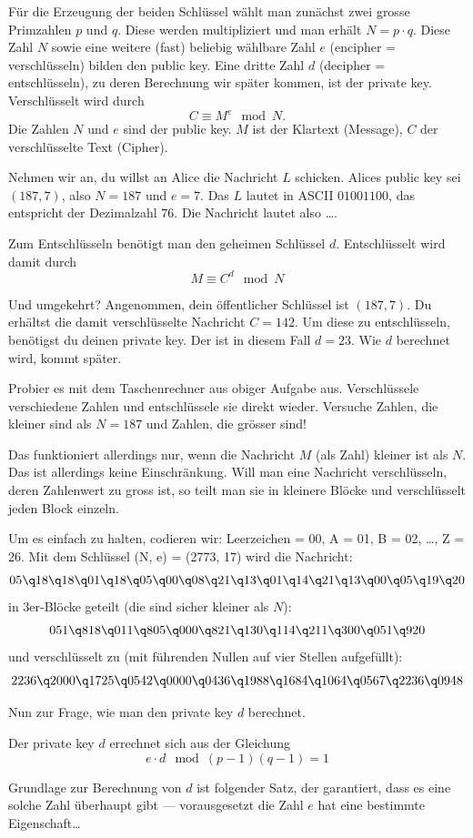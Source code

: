 \documentclass[%
11pt,%
twoside,%
titlepage,%
german,%
headsepline%
]{scrartcl}
\begin{document}
Für die Erzeugung der beiden Schlüssel wählt man zunächst zwei grosse Primzahlen $p$ und $q$. Diese werden multipliziert und man erhält $N=p\cdot q$. Diese Zahl  $N$ sowie eine weitere (fast) beliebig wählbare Zahl  $e$ (encipher = verschlüsseln) bilden den public key. Eine dritte Zahl $d$ (decipher = entschlüsseln), zu deren Berechnung wir später kommen, ist der private key.
Verschlüsselt wird durch
$$C\equiv M^e\mod N.$$
Die Zahlen $N$ und $e$ sind der public key. $M$ ist der Klartext (Message), $C$ der verschlüsselte Text (Cipher).
\begin{ueb}
Nehmen wir an, du willst an Alice die Nachricht $L$ schicken. Alices public key sei $(187, 7)$, also $N=187$ und $e=7$.
Das $L$ lautet in ASCII $01001100$, das entspricht der Dezimalzahl $76$. Die Nachricht lautet also \dots.
\end{ueb}
\noindent Zum Entschlüsseln benötigt man den geheimen Schlüssel $d$. Entschlüsselt wird damit durch $$M\equiv C^d\mod N$$
\begin{ueb}
Und umgekehrt? Angenommen, dein \"offentlicher Schlüssel ist $(187, 7)$. Du erhältst die damit verschlüsselte Nachricht $C=142$. Um diese zu entschlüsseln, ben\"otigst du deinen private key. Der ist in diesem Fall $d=23$. Wie $d$ berechnet wird, kommt später.
\end{ueb}

\begin{ueb}
Probier es mit dem Taschenrechner aus obiger Aufgabe aus. Verschlüssele verschiedene Zahlen und entschlüssele sie direkt wieder. Versuche Zahlen, die kleiner sind als $N=187$ und Zahlen, die gr\"osser sind!
\end{ueb}

\begin{bem}
Das funktioniert allerdings nur, wenn die Nachricht  $M$ (als Zahl) kleiner ist als $N$. Das ist allerdings keine Einschränkung. Will man eine Nachricht verschlüsseln, deren Zahlenwert zu gross ist, so teilt man sie in kleinere Blöcke und verschlüsselt jeden Block einzeln.
\end{bem}

\begin{bsp}
Um es einfach zu halten, codieren wir: Leerzeichen = 00, A = 01, B = 02, \dots, Z = 26.
Mit dem Schlüssel (N, e) = (2773, 17) wird die Nachricht:
$$05\q 18\q 18\q 01\q 18\q 05\q 00\q 08\q 21\q 13\q 01\q 14\q 21\q 13\q 00\q 05\q 19\q 20$$
in 3er-Blöcke geteilt (die sind sicher kleiner als $N$):
$$051\q 818\q 011\q 805\q 000\q 821\q 130\q 114\q 211\q 300\q 051\q 920$$	
und verschlüsselt zu (mit führenden Nullen auf vier Stellen aufgefüllt):
$$2236\q 2000\q 1725\q 0542\q 0000\q 0436\q 1988\q 1684\q 1064\q 0567\q 2236\q 0948$$
\end{bsp}
Nun zur Frage, wie man den private key $d$ berechnet.
\begin{bem}
Der private key $d$ errechnet sich aus der Gleichung
$$e\cdot d\mod(p-1)(q-1)=1$$
\end{bem}
\noindent Grundlage zur Berechnung von $d$ ist folgender Satz, der garantiert, dass es eine solche Zahl überhaupt gibt --- vorausgesetzt die Zahl $e$ hat eine bestimmte Eigenschaft\dots
\end{document}
